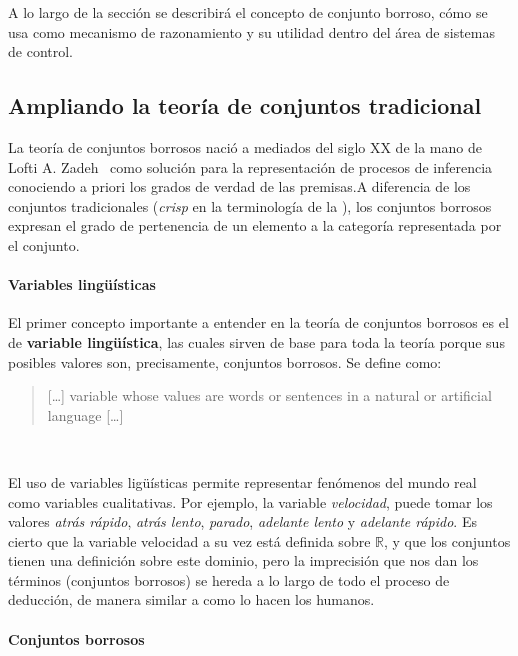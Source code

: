 A lo largo de la sección se describirá el concepto de conjunto borroso, cómo se usa como mecanismo de razonamiento y su utilidad dentro del área de sistemas de control.

\subsection{Ampliando la teoría de conjuntos tradicional}

La teoría de conjuntos borrosos nació a mediados del siglo XX de la mano de Lofti A. Zadeh~\cite{lofti1965fuzzy} como solución para la representación de procesos de inferencia conociendo a priori los grados de verdad de las premisas.A diferencia de los conjuntos tradicionales (\textit{crisp} en la terminología de la ), los conjuntos borrosos expresan el grado de pertenencia de un elemento a la categoría representada por el conjunto.

\paragraph{Variables lingüísticas}

El primer concepto importante a entender en la teoría de conjuntos borrosos es el de \textbf{variable lingüística}, las cuales sirven de base para toda la teoría porque sus posibles valores son, precisamente, conjuntos borrosos. Se define como:

\blockquote{[\ldots] variable whose values are words or sentences in a natural or artificial language [\ldots]}~\cite{zadeh1975concept}

El uso de variables ligüísticas permite representar fenómenos del mundo real como variables cualitativas. Por ejemplo, la variable \textit{velocidad}, puede tomar los valores \textit{atrás rápido}, \textit{atrás lento}, \textit{parado}, \textit{adelante lento} y \textit{adelante rápido}. Es cierto que la variable velocidad a su vez está definida sobre $\mathbb{R}$, y que los conjuntos tienen una definición sobre este dominio, pero la imprecisión que nos dan los términos (conjuntos borrosos) se hereda a lo largo de todo el proceso de deducción, de manera similar a como lo hacen los humanos.

\paragraph{Conjuntos borrosos}

